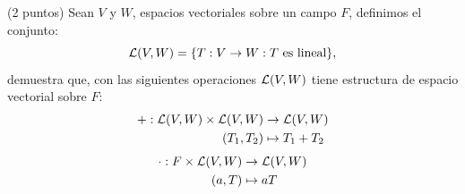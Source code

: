\documentclass[12pt,a4paper]{article}
\begin{document}
    \begin{mdframed}[style=mdpinkbox,frametitle={Ejercicio 5}]
        (2 puntos) Sean $V$ y $W$, espacios vectoriales sobre un campo $F$, definimos el conjunto:
        \begin{equation*}
            \mathcal{L}(V,W)=\{T:V\to W: T\text{ es lineal}\},
        \end{equation*}
        demuestra que, con las siguientes operaciones $\mathcal{L}(V,W)$ tiene estructura de espacio
        vectorial sobre $F$:
        \begin{align*}
            +:\mathcal{L}(V,W)\times\mathcal{L}(V,W)&\to\mathcal{L}(V,W)\\
            (T_{1},T_{2})&\mapsto T_{1}+T_{2}
        \end{align*}
        \begin{align*}
            \cdot:F\times\mathcal{L}(V,W)&\to\mathcal{L}(V,W)\\
            (a,T)&\mapsto aT
        \end{align*}
    \end{mdframed}
\end{document}
